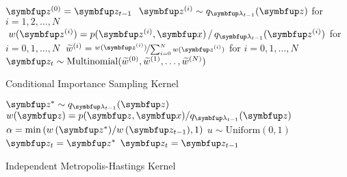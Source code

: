 \begin{minipage}[c]{\textwidth}%
  \begin{algorithm2e}[H]
    \DontPrintSemicolon
    \SetAlgoLined
    \(\vz^{(0)} = \vz_{t-1}\) \;
    \(\;\vz^{(i)} \sim q_{\vlambda_{t-1}}(\vz)\) for \(i = 1, 2,\ldots, N\) \;
    \(\;w(\vz^{(i)}) = p(\vz^{(i)},\vx) \,/\, q_{\vlambda_{t-1}}(\vz^{(i)}) \) for \(i = 0, 1,\ldots, N\)\;
    \(\;\widetilde{w}^{(i)} = \nicefrac{w(\vz^{(i)})}{ \sum^{N}_{i=0} w(\vz^{(i)}) }\) for \(i = 0, 1,\ldots, N\)\;
    \(\vz_{t} \sim \mathrm{Multinomial}(\widetilde{w}^{(0)}, \widetilde{w}^{(1)}, \ldots, \widetilde{w}^{(N)}) \)\;
    \caption{Conditional Importance Sampling Kernel}\label{alg:cis}
  \end{algorithm2e}
\end{minipage}

\begin{minipage}[c]{\textwidth}%
  \begin{algorithm2e}[H]
    \DontPrintSemicolon
    \SetAlgoLined
    \(\vz^* \sim q_{\vlambda_{t-1}}(\vz)\)\;
    \(w(\vz) = p(\vz,\vx)/q_{\vlambda_{t-1}}(\vz) \)\;
    \(\alpha = \min\left( w\,(\vz^*)/w\,(\vz_{t-1}), 1\right)\)\;
    \(u \sim \mathrm{Uniform}(0, 1) \)\;
        {
          \(\vz_t = \vz^*\)
        }
        {
          \(\vz_t = \vz_{t-1}\)
        }
        \caption{Independent Metropolis-Hastings Kernel}\label{alg:imh}
  \end{algorithm2e}
\end{minipage}

